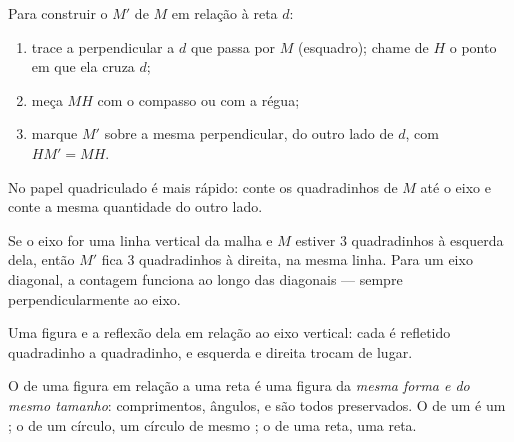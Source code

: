 \begin{method}\label{met:g6:symmetry:construct}
Para construir o  $M'$ de $M$ em relação à reta $d$:
\begin{enumerate}
  \item trace a perpendicular a $d$ que passa por $M$ (esquadro); chame
        de $H$ o ponto em que ela cruza $d$;
  \item meça $MH$ com o compasso ou com a régua;
  \item marque $M'$ sobre a mesma perpendicular, do outro lado de $d$,
        com $HM' = MH$.
\end{enumerate}
No papel quadriculado é mais rápido: conte os quadradinhos de $M$ até o
eixo e conte a mesma quantidade do outro lado.
\end{method}

\begin{example}\label{ex:g6:symmetry:grid}
Se o eixo for uma linha vertical da malha e $M$ estiver $3$
quadradinhos à esquerda dela, então $M'$ fica $3$ quadradinhos à
direita, na mesma linha. Para um eixo diagonal, a contagem funciona ao
longo das diagonais --- sempre perpendicularmente ao eixo.
\end{example}

\begin{omfigure}

{\small Uma figura e a reflexão dela em relação ao eixo vertical: cada
 é refletido quadradinho a quadradinho, e esquerda e direita
trocam de lugar.}
\end{omfigure}

\begin{proposition}\label{prop:g6:symmetry:preserved}
O  de uma figura em relação a uma reta é uma figura da
\emph{mesma forma e do mesmo tamanho}: comprimentos, ângulos,
 e  são todos preservados. O  de um  é
um ; o de um círculo, um círculo de mesmo ; o de uma reta,
uma reta.
\end{proposition}
\admitted

